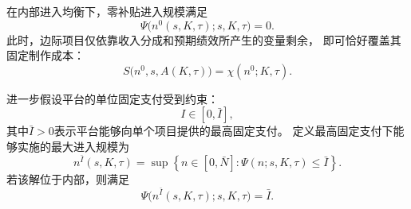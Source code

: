 \documentclass[UTF8, a4paper, 12pt, fontset=fandol]{ctexart}
\theoremstyle{definition}
\theoremstyle{remark}
\begin{document}
在内部进入均衡下，零补贴进入规模满足
\begin{equation}
  \Psi\bigl(n^0(s,K,\tau);s,K,\tau\bigr)=0.
  \label{eq:zero-subsidy-payment}
\end{equation}
此时，边际项目仅依靠收入分成和预期绩效所产生的变量剩余，
即可恰好覆盖其固定制作成本：
\begin{equation*}
  S\bigl(n^0,s,A(K,\tau)\bigr)
  =
  \chi(n^0;K,\tau).
\end{equation*}

进一步假设平台的单位固定支付受到约束：
\begin{equation*}
  I\in[0,\bar I],
\end{equation*}
其中$\bar I>0$表示平台能够向单个项目提供的最高固定支付。
定义最高固定支付下能够实施的最大进入规模为
\begin{equation}
  n^{\bar I}(s,K,\tau)
  =
  \sup
  \left\{
    n\in[0,\bar N]:
    \Psi(n;s,K,\tau)\leq\bar I
  \right\}.
  \label{eq:max-subsidy-entry}
\end{equation}
若该解位于内部，则满足
\begin{equation*}
  \Psi\bigl(n^{\bar I}(s,K,\tau);s,K,\tau\bigr)
  =
  \bar I.
\end{equation*}
\end{document}
